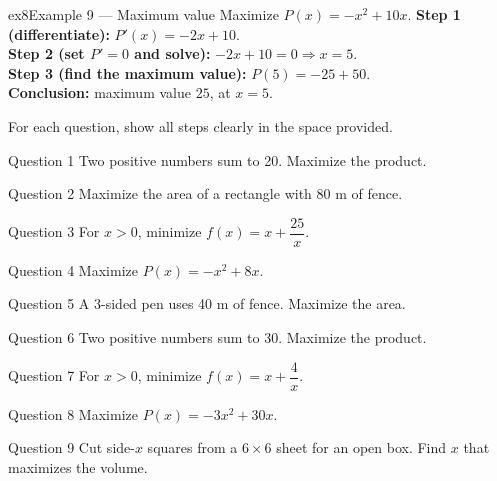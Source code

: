 \documentclass[11pt]{article}
\begin{document}
\begin{example}{ex8}{Example 9 --- Maximum value}
Maximize $P(x)=-x^2+10x$.\soln
\textbf{Step 1 (differentiate):} $P'(x)=-2x+10$.\\[3pt]
\textbf{Step 2 (set $P'=0$ and solve):} $-2x+10=0\Rightarrow x=5$.\\[3pt]
\textbf{Step 3 (find the maximum value):} $P(5)=-25+50$.\\[3pt]
\textbf{Conclusion:} maximum value $25$, at $x=5$.
\end{example}

\clearpage
{}
For each question, show all steps clearly in the space provided.

\begin{qbox}{Question 1}
Two positive numbers sum to 20. Maximize the product.\workspace{2.4cm}
\end{qbox}

\begin{qbox}{Question 2}
Maximize the area of a rectangle with 80 m of fence.\workspace{2.4cm}
\end{qbox}

\begin{qbox}{Question 3}
For $x>0$, minimize $f(x)=x+\dfrac{25}{x}$.\workspace{2.4cm}
\end{qbox}

\begin{qbox}{Question 4}
Maximize $P(x)=-x^2+8x$.\workspace{2.4cm}
\end{qbox}

\begin{qbox}{Question 5}
A 3-sided pen uses 40 m of fence. Maximize the area.\workspace{2.4cm}
\end{qbox}

\begin{qbox}{Question 6}
Two positive numbers sum to 30. Maximize the product.\workspace{2.4cm}
\end{qbox}

\begin{qbox}{Question 7}
For $x>0$, minimize $f(x)=x+\dfrac{4}{x}$.\workspace{2.4cm}
\end{qbox}

\begin{qbox}{Question 8}
Maximize $P(x)=-3x^2+30x$.\workspace{2.4cm}
\end{qbox}

\begin{qbox}{Question 9}
Cut side-$x$ squares from a $6\times6$ sheet for an open box. Find $x$ that maximizes the volume.\workspace{2.4cm}
\end{qbox}
\end{document}
